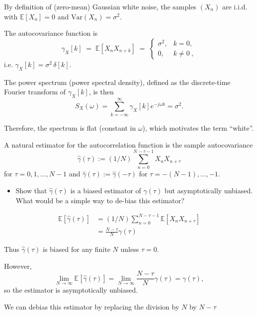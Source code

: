 \documentclass[11pt]{article}
\begin{document}
\begin{solution}
By definition of (zero-mean) Gaussian white noise, the samples $(X_n)$ are i.i.d. with
$\mathbb{E}[X_n] = 0$ and $\mathrm{Var}(X_n)=\sigma^2$.

The autocovariance function is
\[
\gamma_X[k] \;=\; \mathbb{E}[X_n X_{n+k}]
\;=\;
\begin{cases}
\sigma^2, & k = 0,\\
0, & k \neq 0~,
\end{cases}
\]
i.e. $\gamma_X[k] = \sigma^2 \,\delta[k]$.

The power spectrum (power spectral density), defined as the discrete-time Fourier transform of $\gamma_X[k]$, is then
\[
S_X(\omega)
= \sum_{k=-\infty}^{\infty} \gamma_X[k] e^{-j\omega k}
= \sigma^2.
\]

Therefore, the spectrum is flat (constant in $\omega$), which motivates the term ``white''.
\end{solution}



\begin{exercise}
A natural estimator for the autocorrelation function is the sample autocovariance
\begin{equation}
    \hat{\gamma}(\tau) := (1/N) \sum_{n=0}^{N-\tau-1} X_n X_{n+\tau}
\end{equation}
for $\tau=0,1,\dots,N-1$ and $\hat{\gamma}(\tau):=\hat{\gamma}(-\tau)$ for $\tau=-(N-1),\dots,-1$.
\begin{itemize}
    \item Show that $\hat{\gamma}(\tau)$ is a biased estimator of $\gamma(\tau)$ but asymptotically unbiased.
    What would be a simple way to de-bias this estimator?
\end{itemize}

\end{exercise}

\begin{solution}
\begin{equation}
    \begin{split}
   \mathbb{E}[\hat{\gamma}(\tau)] & = (1/N) \sum_{n=0}^{N-\tau-1} \mathbb{E}[X_n X_{n+\tau}] \\
                                  & =  \frac{N-\tau}{N}\gamma(\tau)
    \end{split}
\end{equation}

Thus $\hat{\gamma}(\tau)$ is biased for any finite $N$ unless $\tau=0$. 

However,
\[
\lim_{N \to \infty} \mathbb{E}[\hat{\gamma}(\tau)]
= \lim_{N \to \infty} \frac{N-\tau}{N} \gamma(\tau)
= \gamma(\tau),
\]
so the estimator is asymptotically unbiased.

We can debias this estimator by replacing the division by $N$ by $N-\tau$
    

\end{solution}
\end{document}
